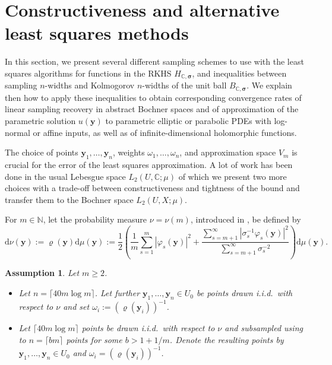 \documentclass[11pt]{article}
\numberwithin{equation}{section}
\newtheorem{assumption}[theorem]{Assumption}
\theoremstyle{definition}
\theoremstyle{remark}
\newcommand{\by}{{\boldsymbol{y}}}
\newcommand{\bsigma}{{\boldsymbol{\sigma}}}
\def\NN{{\mathbb N}}
\def\CC{{\mathbb C}}
\def\CC{{\mathbb C}}
\def\NN{{\mathbb N}}
\def\CC{{\mathbb C}}
\def\NN{{\mathbb N}}
\begin{document}
{\section{Constructiveness and alternative least squares methods}
\label{Constructiveness and alternative least squares methods}

In this section, we present several different sampling schemes to use with the least squares algorithms for functions in the RKHS $H_{\CC,\bsigma}$, and inequalities between sampling $n$-widths and Kolmogorov $n$-widths of the unit ball $B_{\CC,\bsigma}$. We explain then how to apply these inequalities to obtain corresponding convergence rates of linear sampling recovery in abstract Bochner spaces and {of  approximation} of the parametric solution $u(\by)$ to parametric elliptic or parabolic PDEs with log-normal or affine inputs, as well as of infinite-dimensional holomorphic functions.

The choice of points $\by_1, \dots, \by_n$, weights $\omega_1, \dots, \omega_n$, and approximation space $V_m$ is crucial for the error of the least squares approximation.
A lot of work has been done in the usual Lebesgue space $L_2(U,\CC;\mu)$ of which we present two more choices with a trade-off between constructiveness and tightness of the bound and transfer them to the Bochner space $L_2(U,X;\mu)$.


For $m\in\NN$, let the probability measure $\nu = \nu(m)$, introduced in \cite{KU21a}, be defined by
\begin{equation}\label{nu}
	\mathrm d\nu(\by)
	:= \varrho(\by)\mathrm d\mu(\by)
	:= \frac{1}{2}\left( \frac{1}{m}\sum_{s=1}^{m}|\varphi_s(\by)|^2
	+ \frac{\sum_{s=m+1}^{\infty}|\sigma_{s}^{-1}\varphi_s(\by)|^2}
	{\sum_{s=m+1}^{\infty}\sigma_{s}^{-2}} \right)\mathrm d\mu(\by) .
\end{equation}

{
\begin{assumption}\label{points}
    Let $m\ge 2$.
	\begin{itemize}
		\item[\rm (i)]
        Let $n = \lceil 40 m\log m\rceil$.
            Let further $\by_1  ,\dots, \by_{n}\in U_0$ be points drawn i.i.d.\ with respect to $\nu$ and set $\omega_i := (\varrho(\by_i))^{-1}$.
		\item[\rm (ii)]
		Let $\lceil 40 m\log m\rceil$ points be drawn i.i.d.\ with respect to $\nu$ and subsampled using \cite[Algorithm~3]{BSU23} to $n = \lceil bm\rceil$ points for some $b>1+1/m$.
        Denote the resulting points by $\by_1, \dots, \by_{n} \in U_0$ and $\omega_i = (\varrho(\by_i))^{-1}$.
	\end{itemize}
\end{assumption}

}}
\end{document}
